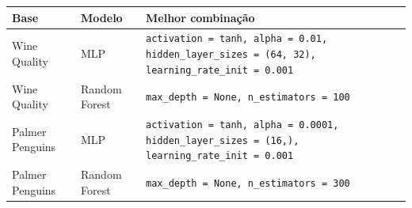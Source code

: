 \begin{tabular}{llp{8cm}}
\toprule
Base & Modelo & Melhor combinação \\
\midrule
Wine Quality & MLP & \texttt{activation = tanh, alpha = 0.01, hidden\_layer\_sizes = (64, 32), learning\_rate\_init = 0.001} \\
\addlinespace
Wine Quality & Random Forest & \texttt{max\_depth = None, n\_estimators = 100} \\
\addlinespace
Palmer Penguins & MLP & \texttt{activation = tanh, alpha = 0.0001, hidden\_layer\_sizes = (16,), learning\_rate\_init = 0.001} \\
\addlinespace
Palmer Penguins & Random Forest & \texttt{max\_depth = None, n\_estimators = 300} \\
\bottomrule
\end{tabular}
